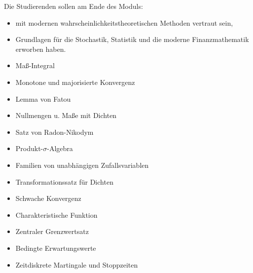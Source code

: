 \begin{module}
\begin{learningoutcomes}
Die Studierenden sollen am Ende des Moduls:

 \begin{itemize}\item mit modernen wahrscheinlichkeitstheoretischen Methoden vertraut sein,  \item Grundlagen für die Stochastik, Statistik und die moderne Finanzmathematik erworben haben.  \end{itemize}
\end{learningoutcomes}

\begin{content}
\begin{itemize}\item Maß-Integral  \item Monotone und majorisierte Konvergenz  \item Lemma von Fatou  \item Nullmengen u. Maße mit Dichten  \item Satz von Radon-Nikodym  \item Produkt-$\sigma{}$-Algebra  \item Familien von unabhängigen Zufallsvariablen  \item Transformationssatz für Dichten  \item Schwache Konvergenz  \item Charakteristische Funktion  \item Zentraler Grenzwertsatz  \item Bedingte Erwartungswerte  \item Zeitdiskrete Martingale und Stoppzeiten  \end{itemize}
\end{content}



\end{module}

